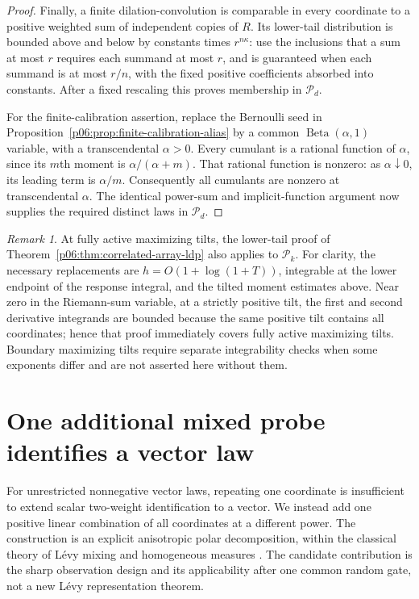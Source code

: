 \documentclass[11pt,letterpaper]{article}
\theoremstyle{definition}
\theoremstyle{remark}
\newtheorem{remark}[theorem]{Remark}
\newcommand{\1}{\mathbf 1}
\begin{document}
\begin{proof}
Finally, a finite dilation-convolution is comparable in every coordinate
to a positive weighted sum of independent copies of $R$.
Its lower-tail distribution is bounded above and below by constants
 times $r^{n\kappa}$: use the inclusions that a sum at most $r$ requires
each summand at most $r$, and is guaranteed when each summand is at most
$r/n$, with the fixed positive coefficients absorbed into constants.
After a fixed rescaling this proves membership in $\mathcal P_d$.

For the finite-calibration assertion, replace the Bernoulli seed in
Proposition~\ref{p06:prop:finite-calibration-alias} by a common
$\operatorname{Beta}(\alpha,1)$ variable, with a transcendental
$\alpha>0$. Every cumulant is a rational function of $\alpha$, since
its $m$th moment is $\alpha/(\alpha+m)$. That rational function is
nonzero: as $\alpha\downarrow0$, its leading term is $\alpha/m$.
Consequently all cumulants are nonzero at transcendental $\alpha$.
The identical power-sum and implicit-function argument now supplies the
required distinct laws in $\mathcal P_d$.
\end{proof}

\begin{remark}
At fully active maximizing tilts, the lower-tail proof of
Theorem~\ref{p06:thm:correlated-array-ldp} also applies to $\mathcal P_k$.
For clarity, the necessary replacements are
$h=O(1+\log(1+T))$, integrable at the lower endpoint of the response
integral, and the tilted moment estimates above. Near zero in the
Riemann-sum variable, at a strictly positive tilt, the first and second
derivative integrands are bounded because the same positive tilt
contains all coordinates; hence that proof immediately covers fully
active maximizing tilts. Boundary maximizing tilts require separate
integrability checks when some exponents differ and are not asserted
here without them.
\end{remark}


\section{One additional mixed probe identifies a vector law}
\label{p06:sec:mixed-probe}

For unrestricted nonnegative vector laws, repeating one coordinate is
insufficient to extend scalar two-weight identification to a vector.
We instead add one positive
linear combination of all coordinates at a different power.
The construction is an explicit anisotropic polar decomposition,
within the classical theory of L\'evy mixing and homogeneous measures
\cite{BRT,BPT,EM}. The candidate contribution is the sharp
observation design and its applicability after one common random gate,
not a new L\'evy representation theorem.
\end{document}
